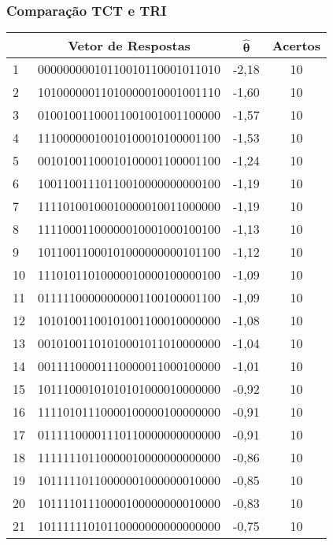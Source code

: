 \documentclass{beamer}
\begin{document}
\begin{frame}
	\frametitle{Comparação TCT e TRI}
	
	\begin{table}[!hbt]
		\centering
		\scriptsize %
		\label{exemplo-10acertos}
		\begin{tabular*}{0.85\textwidth}{@{\extracolsep{\fill}}lccc@{}}
			\hline
			& \textbf{Vetor de Respostas} & $\boldsymbol{\hat{\theta}}$ & \textbf{Acertos} \\ 
			\hline
			1 & 00000000010110010110001011010 & -2,18 & 10 \\ 
			2 & 10100000011010000010001001110 & -1,60 & 10 \\ 
			3 & 01001001100011001001001100000 & -1,57 & 10 \\ 
			4 & 11100000010010100010100001100 & -1,53 & 10 \\ 
			5 & 00101001100010100001100001100 & -1,24 & 10 \\ 
			6 & 10011001110110010000000000100 & -1,19 & 10 \\ 
			7 & 11110100100010000010011000000 & -1,19 & 10 \\ 
			8 & 11110001100000010001000100100 & -1,13 & 10 \\ 
			9 & 10110011000101000000000101100 & -1,12 & 10 \\ 
			10 & 11101011010000010000100000100 & -1,09 & 10 \\ 
			11 & 01111100000000001100100001100 & -1,09 & 10 \\ 
			12 & 10101001100101001100010000000 & -1,08 & 10 \\ 
			13 & 00101001101010001011010000000 & -1,04 & 10 \\ 
			14 & 00111100001110000011000100000 & -1,01 & 10 \\ 
			15 & 10111000101010101000010000000 & -0,92 & 10 \\ 
			16 & 11110101110000100000100000000 & -0,91 & 10 \\ 
			17 & 01111100001110110000000000000 & -0,91 & 10 \\ 
			18 & 11111110110000010000000000000 & -0,86 & 10 \\ 
			19 & 10111110110000001000000010000 & -0,85 & 10 \\ 
			20 & 10111101110000100000000010000 & -0,83 & 10 \\ 
			21 & 10111111010110000000000000000 & -0,75 & 10 \\ 
			\hline
		\end{tabular*}
	\end{table}
\end{frame}
\end{document}
